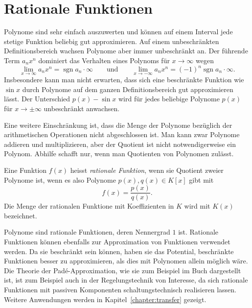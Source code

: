 %
%
%
\section{Rationale Funktionen
\label{buch:polynome:section:rationale-funktionen}}
Polynome sind sehr einfach auszuwerten und können auf einem
Interval jede stetige Funktion beliebig gut approximieren.
Auf einem unbeschränkten Definitionsbereich wachsen Polynome aber
immer unbeschränkt an.
Der führende Term $a_nx^n$ dominiert das Verhalten eines Polynoms
für $x\to\infty$ wegen
\[
\lim_{x\to\infty} a_nx^n
=
\operatorname{sgn} a_n \cdot\infty
\qquad\text{und}\qquad
\lim_{x\to-\infty} a_nx^n
=
(-1)^n \operatorname{sgn} a_n\cdot \infty.
\]
Insbesondere kann man nicht erwarten, dass sich eine beschränkte
Funktion wie $\sin x$ durch Polynome auf dem ganzen Definitionsbereich
gut approximieren lässt.
Der Unterschied $p(x)-\sin x$ wird für jedes beliebige Polynome $p(x)$
für $x\to\pm\infty$ unbeschränkt anwachsen.

Eine weitere Einschränkung ist, dass die Menge der Polynome bezüglich
der arithmetischen Operationen nicht abgeschlossen ist.
Man kann zwar Polynome addieren und multiplizieren, aber der Quotient
ist nicht notwendigerweise ein Polynom.
Abhilfe schafft nur, wenn man Quotienten von Polynomen zulässt.

\begin{definition}
Eine Funktion $f(x)$ heisst {\em rationale Funktion}, wenn sie Quotient
%
zweier Polynome ist, wenn es also Polynome $p(x), q(x)\in K[x]$ gibt mit
\[
f(x) = \frac{p(x)}{q(x)}.
\]
Die Menge der rationalen Funktione mit Koeffizienten in $K$ wird mit
$K(x)$ bezeichnet.
\end{definition}

Polynome sind rationale Funktionen, deren Nennergrad $1$ ist.
Rationale Funktionen können ebenfalls zur Approximation von Funktionen
verwendet werden.
Da sie beschränkt sein können, haben sie das Potential, 
beschränkte Funktionen besser zu approximieren, als dies mit 
Polynomen allein möglich wäre.
Die Theorie der Padé-Approximation, wie sie zum Beispiel im Buch
%
\cite{buch:pade} dargestellt ist, ist zum Beispiel auch in der
Regelungstechnik von Interesse, da sich rationale Funktionen mit
passiven Komponenten schaltungstechnisch realisieren lassen.
Weitere Anwendungen werden in Kapitel~\ref{chapter:transfer}
gezeigt.



